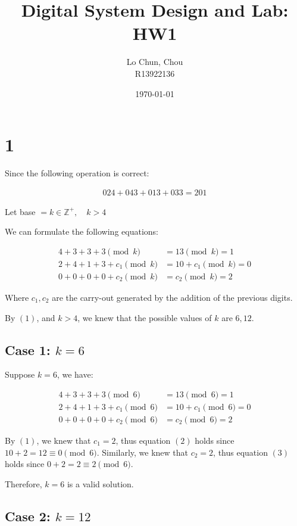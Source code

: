 \documentclass{article}
\title{Digital System Design and Lab: HW1}
\author{Lo Chun, Chou \\ R13922136}
\date\today
\begin{document}
\setlength{\parindent}{0pt}
\maketitle 

\section*{1}

Since the following operation is correct:

\begin{align*}
    024 + 043 + 013 + 033 = 201
\end{align*}

Let base $=k \in \mathbb{Z}^+, \quad k > 4$

We can formulate the following equations:

\begin{align*}
    4 + 3 + 3 + 3 \pmod{k} &= 13 \pmod{k} = 1 \tag{1} \\
    2 + 4 + 1 + 3 + c_1 \pmod{k} &= 10 + c_1 \pmod{k} = 0 \tag{2} \\
    0 + 0 + 0 + 0 + c_2 \pmod{k} &= c_2 \pmod{k} = 2 \tag{3}
\end{align*}

Where $c_1, c_2$ are the carry-out generated by the addition of the previous digits.
\bigskip

By $(1)$, and $k > 4$, we knew that the possible values of $k$ are $6, 12$.

\subsection*{Case 1: $k = 6$}

Suppose $k = 6$, we have:

\begin{align*}
    4 + 3 + 3 + 3 \pmod{6} &= 13 \pmod{6} = 1 \tag{1} \\
    2 + 4 + 1 + 3 + c_1 \pmod{6} &= 10 + c_1 \pmod{6} = 0 \tag{2} \\
    0 + 0 + 0 + 0 + c_2 \pmod{6} &= c_2 \pmod{6} = 2 \tag{3}
\end{align*}

By $(1)$, we knew that $c_1 = 2$, thus equation $(2)$ holds since $10 + 2 = 12 \equiv 0 \pmod{6}$.
Similarly, we knew that $c_2 = 2$, thus equation $(3)$ holds since $0 + 2 = 2 \equiv 2 \pmod{6}$.
\bigskip

Therefore, $k = 6$ is a valid solution.

\subsection*{Case 2: $k = 12$}
\end{document}
